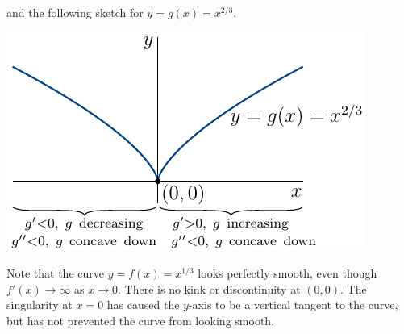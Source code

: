 \begin{eg}[Optional ---  $y=x^{1/3}$ and $y = x^{2/3}$]
\begin{efig}
\begin{center}
 \end{center}
\end{efig}
and the following sketch for $y=g(x)=x^{2/3}$.
\begin{efig}
 \begin{center}
  \includegraphics{sketch10}
 \end{center}
\end{efig}
Note that the curve $y=f(x)=x^{1/3}$ looks perfectly smooth, even though 
$f'(x)\rightarrow\infty$ as $x\rightarrow 0$. There is no kink or discontinuity at $(0,0)$. The singularity at $x=0$ has caused the $y$-axis to be a vertical tangent to the curve, but has not prevented the curve from looking smooth.


\end{eg}





